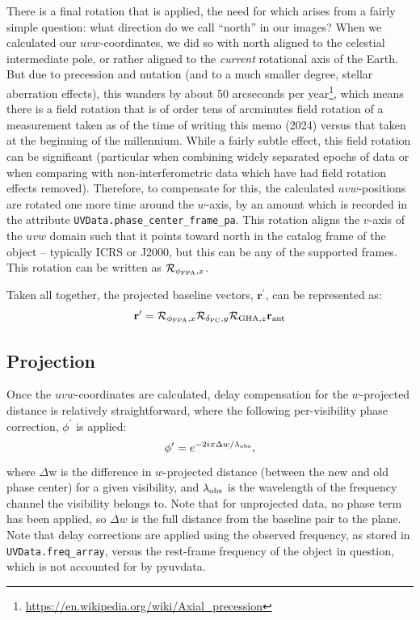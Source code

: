 \documentclass[11pt, oneside]{article}
\begin{document}
There is a final rotation that is applied, the need for which arises from a fairly simple question: what direction do we call ``north'' in our images? When we calculated our $uvw$-coordinates, we did so with north aligned to the celestial intermediate pole, or rather aligned to the \emph{current} rotational axis of the Earth. But due to precession and nutation (and to a much smaller degree, stellar aberration effects), this wanders by about 50 arcseconds per year\footnote{\url{https://en.wikipedia.org/wiki/Axial_precession}}, which means there is a field rotation that is of order tens of arcminutes field rotation of a measurement taken as of the time of writing this memo (2024) versus that taken at the beginning of the millennium. While a fairly subtle effect, this field rotation can be significant (particular when combining widely separated epochs of data or when comparing with non-interferometric data which have had field rotation effects removed).  Therefore, to compensate for this, the calculated $uvw$-positions are rotated one more time around the $w$-axis, by an amount which is recorded in the attribute \texttt{UVData.phase\_center\_frame\_pa}. This rotation aligns the $v$-axis of the $uvw$ domain such that it points toward north in the catalog frame of the object -- typically ICRS or J2000, but this can be any of the supported frames. This rotation can be written as $\mathcal{R}_{\phi_{\rm FPA},x}$.

Taken all together, the projected baseline vectors, $\mathbf{r}^{\prime}$, can be represented as:
\begin{equation}
\mathbf{r}^{\prime} = \mathcal{R}_{\phi_{\rm FPA},x} \mathcal{R}_{\delta_{\rm PC}, y} \mathcal{R}_{\textrm{GHA}, z} \mathbf{r}_{\rm ant}
\end{equation}
\subsection{Projection}\label{ssec:projection}
Once the $uvw$-coordinates are calculated, delay compensation for the $w$-projected distance is relatively straightforward, where the following per-visibility phase correction, $\phi^{\prime}$ is applied:
\begin{equation}\label{eqn:projection}
\phi^{\prime} = e^{-2i\pi\Delta w / \lambda_{\rm obs}},
\end{equation}
where $\Delta$w is the difference in $w$-projected distance (between the new and old phase center) for a given visibility, and $\lambda_{\rm obs}$ is the wavelength of the frequency channel the visibility belongs to. Note that for unprojected data, no phase term has been applied, so $\Delta w$ is the full distance from the baseline pair to the plane. Note that delay corrections are applied using the observed frequency, as stored in \texttt{UVData.freq\_array}, versus the rest-frame frequency of the object in question, which is not accounted for by pyuvdata.
\end{document}
